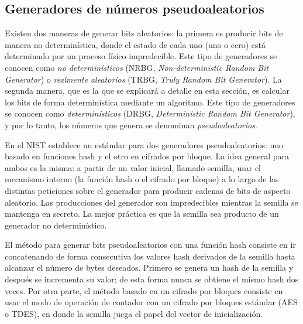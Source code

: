
\subsection{Generadores de números pseudoaleatorios}

Existen dos maneras de generar bits aleatorios: la primera es producir bits de
manera no determinística, donde el estado de cada uno (uno o cero) está
determinado por un proceso físico impredecible. Este tipo de generadores se
conocen como \textit{no determinísticos} (NRBG, \textit{Non-deterministic Random
Bit Generator}) o \textit{realmente aleatorios} (TRBG, \textit{Truly Random Bit
Generator}). La segunda manera, que es la que se explicará a detalle en esta
sección, es calcular los bits de forma determinística mediante un algoritmo.
Este tipo de generadores se conocen como \textit{determinísticos} (DRBG,
\textit{Deterministic Random Bit Generator}), y por lo tanto, los números que
genera se denominan \textit{pseudoaleatorios}.

En \cite{nist_aleatorios} el NIST establece un estándar para dos generadores
pseudoaleatorios: uno basado en funciones hash y el otro en cifrados por bloque.
La idea general para ambos es la misma: a partir de un valor inicial, llamado
semilla, usar el mecanismo interno (la función hash o el cifrado por bloque) a
lo largo de las distintas peticiones sobre el generador para producir cadenas de
bits de aspecto aleatorio. Las producciones del generador son impredecibles
mientras la semilla se mantenga en secreto. La mejor práctica es que la semilla
sea producto de un generador no determinístico.


El método para generar bits pseudoaleatorios con una función hash consiste en ir
concatenando de forma consecutiva los valores hash derivados de la semilla hasta
alcanzar el número de bytes deseados. Primero se genera un hash de la semilla y
después se incrementa su valor; de esta forma nunca se obtiene el mismo hash dos
veces. Por otra parte, el método basado en un cifrado por bloques consiste en
usar el modo de operación de contador con un cifrado por bloques estándar (AES o
TDES), en donde la semilla juega el papel del vector de inicialización.
